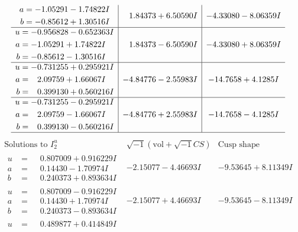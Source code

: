 \documentclass[1p]{elsarticle_modified}
\theoremstyle{definition}
\newcommand{\I}{\sqrt{-1}}
\begin{document}
$$\begin{array}{c|c|c}
\begin{aligned}
a &= -1.05291 - 1.74822 I \\
b &= -0.85612 + 1.30516 I\end{aligned}
 & \phantom{-}1.84373 + 6.50590 I & -4.33080 - 8.06359 I \\ \hline\begin{aligned}
u &= -0.956828 - 0.652363 I \\
a &= -1.05291 + 1.74822 I \\
b &= -0.85612 - 1.30516 I\end{aligned}
 & \phantom{-}1.84373 - 6.50590 I & -4.33080 + 8.06359 I \\ \hline\begin{aligned}
u &= -0.731255 + 0.295921 I \\
a &= \phantom{-}2.09759 + 1.66067 I \\
b &= \phantom{-}0.399130 + 0.560216 I\end{aligned}
 & -4.84776 - 2.55983 I & -14.7658 + 4.1285 I \\ \hline\begin{aligned}
u &= -0.731255 - 0.295921 I \\
a &= \phantom{-}2.09759 - 1.66067 I \\
b &= \phantom{-}0.399130 - 0.560216 I\end{aligned}
 & -4.84776 + 2.55983 I & -14.7658 - 4.1285 I\\
 \hline 
 \end{array}$$\newpage$$\begin{array}{c|c|c}  
\text{Solutions to }I^u_{2}& \I (\text{vol} + \sqrt{-1}CS) & \text{Cusp shape}\\
 \hline 
\begin{aligned}
u &= \phantom{-}0.807009 + 0.916229 I \\
a &= \phantom{-}0.14430 - 1.70974 I \\
b &= \phantom{-}0.240373 + 0.893634 I\end{aligned}
 & -2.15077 - 4.46693 I & -9.53645 + 8.11349 I \\ \hline\begin{aligned}
u &= \phantom{-}0.807009 - 0.916229 I \\
a &= \phantom{-}0.14430 + 1.70974 I \\
b &= \phantom{-}0.240373 - 0.893634 I\end{aligned}
 & -2.15077 + 4.46693 I & -9.53645 - 8.11349 I \\ \hline\begin{aligned}
u &= \phantom{-}0.489877 + 0.414849 I \\

\end{aligned}
\end{array}$$
\end{document}
